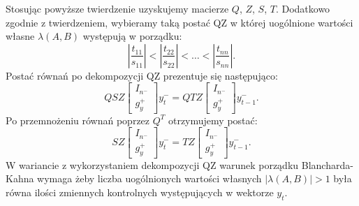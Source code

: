 Stosując powyższe twierdzenie uzyskujemy macierze $Q$, $Z$, $S$, $T$. Dodatkowo zgodnie z twierdzeniem, wybieramy taką postać QZ w której uogólnione wartości własne $\lambda(A,B)$ występują w porządku:
\begin{equation}
    \left|\frac{t_{11}}{s_{11}}\right| < |\frac{t_{22}}{s_{22}}| < \dots < |\frac{t_{nn}}{s_{nn}}|.
\end{equation}
Postać równań po dekompozycji QZ prezentuje się następująco:
\begin{equation}
    \label{eqn:qzMainEq}
    Q S Z
    \begin{bmatrix}
        I_{n^-} \\
        g_y^+
    \end{bmatrix}  y_t^- = 
    Q T Z
    \begin{bmatrix}
        I_{n^-} \\
        g_y^+
    \end{bmatrix} y^-_{t-1}.
\end{equation}
Po przemnożeniu równań poprzez $Q^T$ otrzymujemy postać:
\begin{equation}
    S Z
    \begin{bmatrix}
        I_{n^-} \\
        g_y^+
    \end{bmatrix}  y_t^- = 
    T Z
    \begin{bmatrix}
        I_{n^-} \\
        g_y^+
    \end{bmatrix} y^-_{t-1}.
\end{equation}
W wariancie z wykorzystaniem dekompozycji QZ warunek porządku Blancharda-Kahna wymaga żeby liczba uogólnionych wartości własnych $|\lambda(A,B)| > 1$ była równa ilości zmiennych kontrolnych występujących w wektorze $y_t$.

